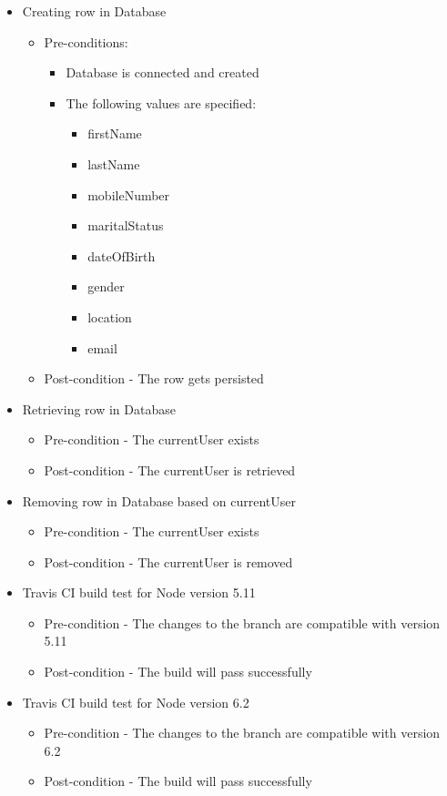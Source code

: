 \documentclass{article}
\begin{document}
\begin{itemize}
\item Creating row in Database
\begin{itemize}
	\item Pre-conditions:
		\begin{itemize}
		\item Database is connected and created
		\item The following values are specified:  
		\begin{itemize}
		\item firstName
  		\item lastName
  		\item mobileNumber 
  		\item maritalStatus 
  		\item dateOfBirth 
 		\item gender
  		\item location 
 		\item email
 		\end{itemize} 
		\end{itemize}
\item Post-condition - The row gets persisted
\end{itemize}
\item Retrieving row in Database
	\begin{itemize}
	\item Pre-condition - The currentUser exists
	\item Post-condition - The currentUser is retrieved 
	\end{itemize}

\item Removing row in Database based on currentUser 
	\begin{itemize}
	\item Pre-condition - The currentUser exists
	\item Post-condition - The currentUser is removed
	\end{itemize}

\item Travis CI build test for Node version 5.11
	\begin{itemize}
	\item Pre-condition - The changes to the branch are compatible with version 5.11
	\item Post-condition - The build will pass successfully 
	\end{itemize}	
	
\item Travis CI build test for Node version 6.2
	\begin{itemize}
	\item Pre-condition - The changes to the branch are compatible with version 6.2
	\item Post-condition - The build will pass successfully 
\end{itemize}
\end{itemize}
\end{document}
